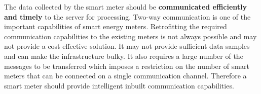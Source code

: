 The data collected by the smart meter should be \textbf{communicated efficiently and timely} to the server for processing. Two-way communication is one of the important capabilities of smart energy meters. Retrofitting the required communication capabilities to the existing meters is not always possible and may not provide a cost-effective solution. It may not provide sufficient data samples and can make the infrastructure bulky. It also requires a large number of the messages to be transferred which imposes a restriction on the number of smart meters that can be connected on a single communication channel. Therefore a smart meter should provide intelligent inbuilt communication capabilities.


